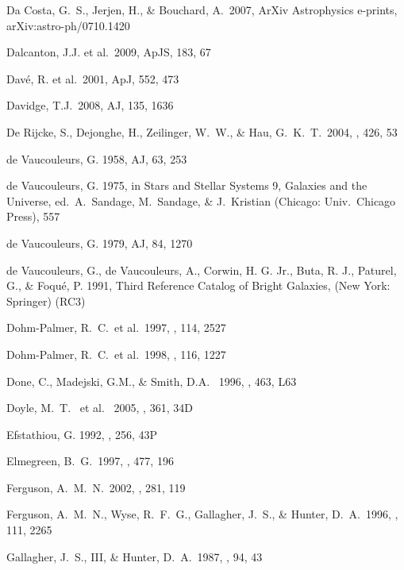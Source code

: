 \documentclass[12pt,preprint]{emulateapj}
\begin{document}
\begin{thebibliography}{}
Da Costa, G.~S., Jerjen, H., \& Bouchard, A.\ 2007, ArXiv Astrophysics e-prints, arXiv:astro-ph/0710.1420

Dalcanton, J.J. et al.\ 2009, ApJS, 183, 67 

Dav\'e, R. et al.\ 2001, ApJ, 552, 473

Davidge, T.J.\ 2008, AJ, 135, 1636

De Rijcke, S., Dejonghe, H., Zeilinger, W.~W., \& Hau, G.~K.~T.\ 2004, \aap, 426, 53 

de Vaucouleurs, G. 1958, AJ, 63, 253

de Vaucouleurs, G. 1975, in Stars and Stellar Systems 9, Galaxies
and the Universe, ed.\ A.\ Sandage, M.\ Sandage, \& J.\ Kristian
(Chicago: Univ.\ Chicago Press), 557

de Vaucouleurs, G. 1979, AJ, 84, 1270

de Vaucouleurs, G., de Vaucouleurs, A., Corwin, H. G. Jr.,
Buta, R. J., Paturel, G., \& Foqu\'e, P. 1991, Third Reference
Catalog of Bright Galaxies, (New York: Springer) (RC3)

Dohm-Palmer, R.~C.~et al.\ 1997, \aj, 114, 2527 

Dohm-Palmer, R.~C.~et al.\ 1998, \aj, 116, 1227 

Done, C., Madejski, G.M., \& Smith, D.A. \ 1996, \apj, 463, L63 

Doyle, M.~T. ~et al. \ 2005, \mnras, 361, 34D 

Efstathiou, G. 1992, \mnras, 256, 43P 

Elmegreen, B.~G.\ 1997, \apj, 477, 196 

Ferguson, A.~M.~N.\ 2002, \apss, 281, 119 

Ferguson, A.~M.~N., Wyse, R.~F.~G., Gallagher, J.~S., \& Hunter, D.~A.\ 
1996, \aj, 111, 2265 

Gallagher, J.~S., III, \& Hunter, D.~A.\ 1987, \aj, 94, 43 


\end{thebibliography}
\end{document}
